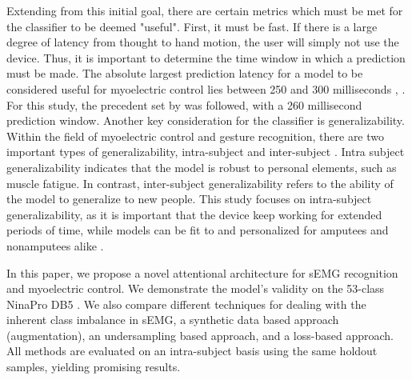  Extending from this initial goal, there are certain metrics which must be met for the classifier to be deemed "useful". First, it must be fast. If there is a large degree of latency from thought to hand motion, the user will simply not use the device. Thus, it is important to determine the time window in which a prediction must be made. The absolute largest prediction latency for a model to be considered useful for myoelectric control lies between 250 and 300 milliseconds  \cite{300ms}, \cite{250ms}. For this study, the precedent set by \cite{primary} was followed, with a 260 millisecond prediction window.
Another key consideration for the classifier is generalizability. Within the field of myoelectric control and gesture recognition, there are two important types of generalizability, intra-subject and inter-subject \cite{ring_2018}. Intra subject generalizability indicates that the model is robust to personal elements, such as muscle fatigue. In contrast, inter-subject generalizability refers to the ability of the model to generalize to new people. This study focuses on intra-subject generalizability, as it is important that the device keep working for extended periods of time, while models can be fit to and personalized for amputees and nonamputees alike \cite{amputeedb}. \par
In this paper, we propose a novel attentional architecture for sEMG recognition and myoelectric control. We demonstrate the model's validity on the 53-class NinaPro DB5 \cite{nina5}. We also compare different techniques  for dealing with the inherent class imbalance in sEMG, a synthetic data based approach (augmentation), an undersampling based approach, and a loss-based approach. All methods are evaluated on an intra-subject basis using the same holdout samples, yielding promising results.








